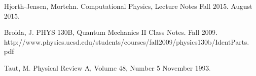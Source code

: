 \documentclass[%
oneside,                 %
final,                   %
10pt]{article}
\begin{document}

\begin{thebibliography}{9}

Hjorth-Jensen, Mortehn. 
Computational Physics, Lecture Notes Fall 2015. 
August 2015.


Broida, J.
PHYS 130B, Quantum Mechanics II Class Notes.
Fall 2009.
http://www.physics.ucsd.edu/students/courses/fall2009/physics130b/IdentParts.pdf

Taut, M.
Physical Review A, Volume 48, Number 5
November 1993.

\end{thebibliography}



\end{document}
